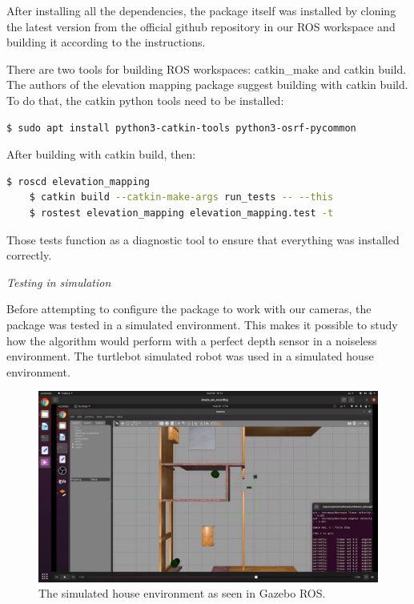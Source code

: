 \documentclass{article}
\begin{document}
After installing all the dependencies, the package itself was installed by cloning the latest version from the official github repository in our ROS workspace and building it according to the instructions. 

There are two tools for building ROS workspaces: catkin\_make and catkin build. The authors of the elevation mapping package suggest building with catkin build. To do that, the catkin python tools need to be installed:

\begin{lstlisting}[language=bash]
    $ sudo apt install python3-catkin-tools python3-osrf-pycommon
\end{lstlisting}

After building with catkin build, then:

\begin{lstlisting}[language=bash]
    $ roscd elevation_mapping
    $ catkin build --catkin-make-args run_tests -- --this
    $ rostest elevation_mapping elevation_mapping.test -t
\end{lstlisting}

Those tests function as a diagnostic tool to ensure that everything was installed correctly.

\bigskip

\textit{Testing in simulation}

\bigskip

Before attempting to configure the package to work with our cameras, the package was tested in a simulated environment. This makes it possible to study how the algorithm would perform with a perfect depth sensor in a noiseless environment. The turtlebot simulated robot was used in a simulated house environment.


\begin{figure}[h] %
    \centering
	\includegraphics[width=\textwidth,height=\textheight,keepaspectratio]{report1-img015.png} %
	\caption{The simulated house environment as seen in Gazebo ROS. }
\end{figure}
\end{document}
